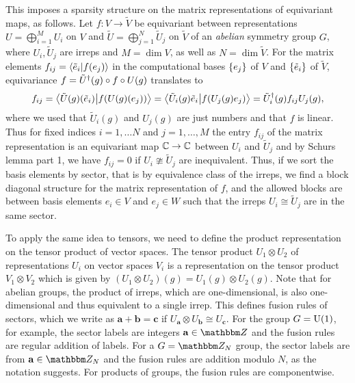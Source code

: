 This imposes a sparsity structure on the matrix representations of equivariant maps, as follows.
%
Let $f: V \to \tilde{V}$ be equivariant between representations $U = \bigoplus_{i=1}^{M} U_i$ on $V$ and $\tilde{U} = \bigoplus_{j=1}^{N} \tilde{U}_j$ on $\tilde{V}$ of an \emph{abelian} symmetry group $G$, where $U_i, \tilde{U}_j$ are irreps and $M = \dim V$, as well as $N = \dim \tilde{V}$.
%
For the matrix elements $f_{ij} = \braket{\tilde{e}_i}{f(e_j)}$ in the computational bases $\set{e_j}$ of $V$ and $\set{\tilde{e}_i}$ of $\tilde{V}$, equivariance $f = \tilde{U}^\dagger(g) \circ f \circ U(g)$ translates to
\begin{equation}
    f_{ij}
    = \braket{\tilde{U}(g)(\tilde{e}_i)}{f(U(g)(e_j))}
    = \braket{\tilde{U}_i(g) \tilde{e}_i}{f(U_j(g) e_j )}
    = \tilde{U}^\dagger_i(g) f_{ij} U_j(g)
    ,
\end{equation}
where we used that $\tilde{U}_i(g)$ and $U_j(g)$ are just numbers and that $f$ is linear.
%
Thus for fixed indices $i = 1,\dots N$ and $j = 1,\dots, M$ the entry $f_{ij}$ of the matrix representation is an equivariant map $\mathbb{C} \to \mathbb{C}$ between $U_i$ and $\tilde{U}_j$ and by Schurs lemma part 1, we have $f_{ij} = 0$ if $U_i \ncong \tilde{U}_j$ are inequivalent.
%
Thus, if we sort the basis elements by sector, that is by equivalence class of the irreps, we find a block diagonal structure for the matrix representation of $f$, and the allowed blocks are between basis elements $e_i \in V$ and $e_j \in W$ such that the irreps $U_i \cong \tilde{U}_j$ are in the same sector.

To apply the same idea to tensors, we need to define the product representation on the tensor product of vector spaces.
%
The tensor product $U_1 \otimes U_2$ of representations $U_i$ on vector spaces $V_i$ is a representation on the tensor product $V_1 \otimes V_2$ which is given by $(U_1 \otimes U_2)(g) = U_1(g) \otimes U_2(g)$.
%
Note that for abelian groups, the product of irreps, which are one-dimensional, is also one-dimensional and thus equivalent to a single irrep.
%
This defines fusion rules of sectors, which we write as $\mathbf{a} + \mathbf{b} = \mathbf{c}$ if $U_\mathbf{a} \otimes U_\mathbf{b} \cong U_\mathbf{c}$.
%
For the group $G = \mathrm{U}(1)$, for example, the sector labels are integers $\mathbf{a} \in \Zbb$ and the fusion rules are regular addition of labels.
%
For a $G = \Zbb_N$ group, the sector labels are from $\mathbf{a} \in \Zbb_N$ and the fusion rules are addition modulo $N$, as the notation suggests.
%
For products of groups, the fusion rules are componentwise.


